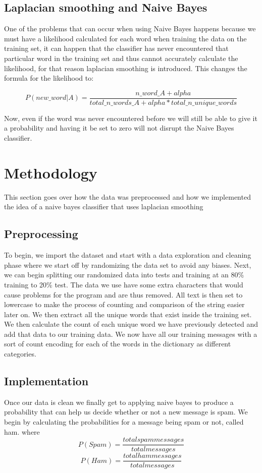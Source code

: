 \subsection{Laplacian smoothing and Naive Bayes}
One of the problems that can occur when using Naive Bayes happens because we must have a likelihood calculated for each word when training the data on the training set, it can happen that the classifier has never encountered that particular word in the training set and thus cannot accurately calculate the likelihood, for that reason laplacian smoothing is introduced. This changes the formula for the likelihood to:



 
 \[P(new\_word|A)= \frac{n\_word\_A + alpha}{total\_n\_words\_A + alpha*total\_n\_unique\_words}\]
 
 
 Now, even if the word was never encountered before we will still be able to give it a probability and having it be set to zero will not disrupt the Naive Bayes classifier.

\section{Methodology}
This section goes over how the data was preprocessed and how we implemented the idea of a naive bayes classifier that uses laplacian smoothing
\subsection{Preprocessing}
To begin, we import the dataset and start with a data exploration and cleaning phase where we start off by randomizing the data set to avoid any biases. Next, we can begin splitting our randomized data into tests and training at an 80\% training to 20\% test. The data we use have some extra characters that would cause problems for the program and are thus removed. All text is then set to lowercase to make the process of counting and comparison of the string easier later on.
We then extract all the unique words that exist inside the training set. We then calculate the count of each unique word we have previously detected and add that data to our training data. We now have all our training messages with a sort of count encoding for each of the words in the dictionary as different categories.


\subsection{Implementation}
Once our data is clean we finally get to applying naive bayes to produce a probability that can help us decide whether or not a new message is spam. We begin by calculating the probabilities for a message being spam or not, called ham. where 
\[ P(Spam) = \frac{total spam messages}{total messages} \]  
\[ P(Ham) = \frac{total ham messages}{total messages} \] 

